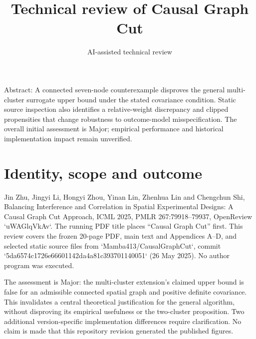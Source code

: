 \documentclass[10pt]{article}
\title{Technical review of Causal Graph Cut}
\author{AI-assisted technical review}
\date{}
\begin{document}
\maketitle
Abstract: A connected seven-node counterexample disproves the general multi-cluster surrogate upper bound under the stated covariance condition. Static source inspection also identifies a relative-weight discrepancy and clipped propensities that change robustness to outcome-model misspecification. The overall initial assessment is Major; empirical performance and historical implementation impact remain unverified.\par
\section*{Identity, scope and outcome}
Jin Zhu, Jingyi Li, Hongyi Zhou, Yinan Lin, Zhenhua Lin and Chengchun Shi, Balancing Interference and Correlation in Spatial Experimental Designs: A Causal Graph Cut Approach, ICML 2025, PMLR 267:79918–79937, OpenReview `uWAGlqVkAv`. The running PDF title places “Causal Graph Cut” first. This review covers the frozen 20-page PDF, main text and Appendices A–D, and selected static source files from `Mamba413/CausalGraphCut`, commit `5da6574c1726e66601142da4a81c393701140051` (26 May 2025). No author program was executed.\par
The assessment is Major: the multi-cluster extension’s claimed upper bound is false for an admissible connected spatial graph and positive definite covariance. This invalidates a central theoretical justification for the general algorithm, without disproving its empirical usefulness or the two-cluster proposition. Two additional version-specific implementation differences require clarification. No claim is made that this repository revision generated the published figures.\par
\end{document}

